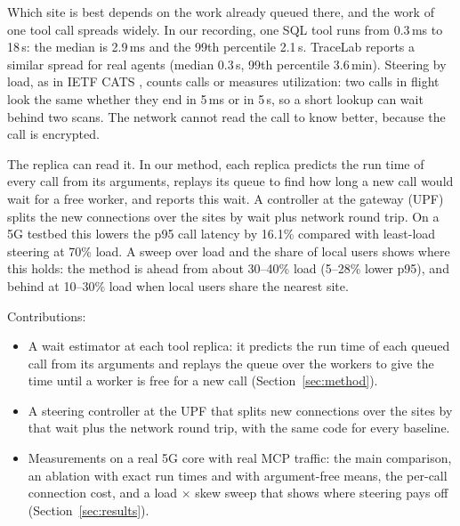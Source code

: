 \documentclass{article}
\begin{document}
Which site is best depends on the work already queued there, and the work of one tool call
spreads widely. In our recording, one SQL tool runs from 0.3\,ms to 18\,s: the median is
2.9\,ms and the 99th percentile 2.1\,s. TraceLab \citep{tracelab} reports a similar spread
for real agents (median 0.3\,s, 99th percentile 3.6\,min). Steering by load, as in IETF CATS
\citep{cats_rfc}, counts calls or measures utilization: two calls in flight look the same
whether they end in 5\,ms or in 5\,s, so a short lookup can wait behind two scans. The
network cannot read the call to know better, because the call is encrypted.

The replica can read it. In our method, each replica predicts the run time of every call
from its arguments, replays its queue to find how long a new call would wait for a free
worker, and reports this wait. A controller at the gateway (UPF) splits the new connections
over the sites by wait plus network round trip. On a 5G testbed this lowers the p95 call
latency by 16.1\% compared with least-load steering at 70\% load. A sweep over load and
the share of local users shows where this holds: the method is ahead from about 30--40\%
load (5--28\% lower p95), and behind at 10--30\% load when local users share the nearest
site.

Contributions:
\begin{itemize}
  \item A wait estimator at each tool replica: it predicts the run time of each queued
  call from its arguments and replays the queue over the workers to give the time until
  a worker is free for a new call (Section~\ref{sec:method}).
  \item A steering controller at the UPF that splits new connections over the sites by
  that wait plus the network round trip, with the same code for every baseline.
  \item Measurements on a real 5G core with real MCP traffic: the main comparison, an
  ablation with exact run times and with argument-free means, the per-call connection
  cost, and a load $\times$ skew sweep that shows where steering pays off
  (Section~\ref{sec:results}).
\end{itemize}
\end{document}
